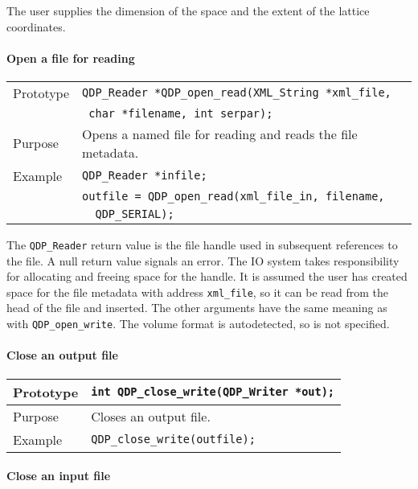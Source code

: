 \documentclass{article}
\newcommand{\QMDhandle}{{\tt XML\_String}}
\begin{document}
The user supplies the dimension of the space and the extent of the
lattice coordinates.

\paragraph{Open a file for reading}

\begin{flushleft}
  \begin{tabular}{|l|l|}
  \hline
  Prototype      & \verb|QDP_Reader *QDP_open_read(|\QMDhandle \verb| *xml_file,|\\
                 & \verb| char *filename, int serpar);|\\
    \hline
  Purpose        & Opens a named file for reading and reads the file metadata. \\
\hline
  Example  & \verb|QDP_Reader *infile;| \\
           & \verb|outfile = QDP_open_read(xml_file_in, filename, |\\
	   & \verb|  QDP_SERIAL);| \\
   \hline
 \end{tabular}
\end{flushleft}
%
The \verb|QDP_Reader| return value is the file handle used in
subsequent references to the file.  A null return value signals an
error. The IO system takes responsibility for allocating and freeing
space for the handle.  It is assumed the user has created space for
the file metadata with address \verb|xml_file|, so it can be read from
the head of the file and inserted.  The other arguments have the same
meaning as with \verb|QDP_open_write|.  The volume format is
autodetected, so is not specified.
%
\paragraph{Close an output file}

\begin{flushleft}
  \begin{tabular}{|l|l|}
  \hline
  Prototype      & \verb|int QDP_close_write(QDP_Writer *out);| \\
    \hline
  Purpose        & Closes an output file. \\
\hline
  Example        & \verb|QDP_close_write(outfile);|\\
   \hline
 \end{tabular}
\end{flushleft}
%
\paragraph{Close an input file}
\end{document}
